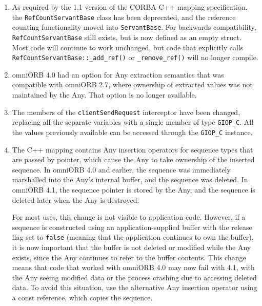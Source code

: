 \documentclass[11pt,oneside,a4paper]{book}
\newcommand{\type}[1]{\texttt{#1}}
\newcommand{\code}[1]{\texttt{#1}}
\newcommand{\op}[1]{\texttt{#1()}}
\begin{document}
\begin{enumerate}

\item As required by the 1.1 version of the CORBA C++ mapping
  specification, the \type{RefCountServantBase} class has been
  deprecated, and the reference counting functionality moved into
  \type{ServantBase}. For backwards compatibility,
  \type{RefCountServantBase} still exists, but is now defined as an
  empty struct. Most code will continue to work unchanged, but code
  that explicitly calls \op{RefCountServantBase::\_add\_ref} or
  \op{\_remove\_ref} will no longer compile.

\item omniORB 4.0 had an option for Any extraction semantics that was
  compatible with omniORB 2.7, where ownership of extracted values was
  not maintained by the Any. That option is no longer available.

\item The members of the \code{clientSendRequest} interceptor have
  been changed, replacing all the separate variables with a single
  member of type \code{GIOP\_C}. All the values previously available
  can be accessed through the \code{GIOP\_C} instance.

\item The C++ mapping contains Any insertion operators for sequence
  types that are passed by pointer, which cause the Any to take
  ownership of the inserted sequence. In omniORB 4.0 and earlier, the
  sequence was immediately marshalled into the Any's internal buffer,
  and the sequence was deleted. In omniORB 4.1, the sequence pointer
  is stored by the Any, and the sequence is deleted later when the Any
  is destroyed.

  For most uses, this change is not visible to application code.
  However, if a sequence is constructed using an application-supplied
  buffer with the release flag set to \code{false} (meaning that the
  application continues to own the buffer), it is now important that
  the buffer is not deleted or modified while the Any exists, since
  the Any continues to refer to the buffer contents.  This change
  means that code that worked with omniORB 4.0 may now fail with 4.1,
  with the Any seeing modified data or the process crashing due to
  accessing deleted data. To avoid this situation, use the alternative
  Any insertion operator using a const reference, which copies the
  sequence.

\end{enumerate}
\end{document}
